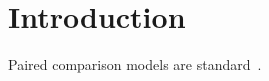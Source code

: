 \documentclass{article}
\begin{document}
\section{Introduction}
Paired comparison models are standard~\cite{Bradley1952}.


\end{document}
